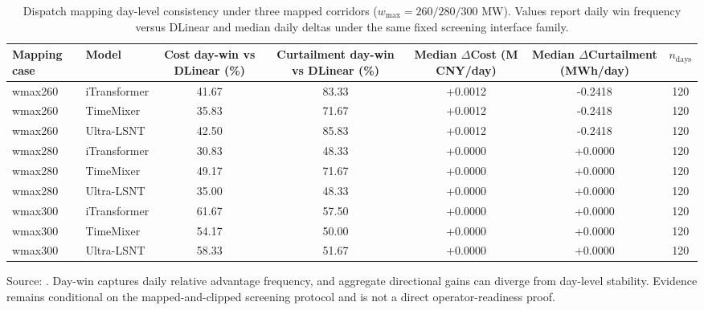﻿\documentclass[review,1p,times]{elsarticle}
\begin{document}
\begin{table}[t]
\centering
\caption{Dispatch mapping day-level consistency under three mapped corridors ($w_{\max}=260/280/300$ MW). Values report daily win frequency versus DLinear and median daily deltas under the same fixed screening interface family.}
\label{tab:dispatch_mapping_daylevel_consistency}
\begingroup
\setlength{\tabcolsep}{4pt}
\small
\begin{tabular}{llccccc}
\toprule
Mapping case & Model & Cost day-win vs DLinear (\%) & Curtailment day-win vs DLinear (\%) & Median $\Delta$Cost (M CNY/day) & Median $\Delta$Curtailment (MWh/day) & $n_{\text{days}}$ \\
\midrule
wmax260 & iTransformer & 41.67 & 83.33 & +0.0012 & -0.2418 & 120 \\
wmax260 & TimeMixer & 35.83 & 71.67 & +0.0012 & -0.2418 & 120 \\
wmax260 & Ultra-LSNT & 42.50 & 85.83 & +0.0012 & -0.2418 & 120 \\
\midrule
wmax280 & iTransformer & 30.83 & 48.33 & +0.0000 & +0.0000 & 120 \\
wmax280 & TimeMixer & 49.17 & 71.67 & +0.0000 & +0.0000 & 120 \\
wmax280 & Ultra-LSNT & 35.00 & 48.33 & +0.0000 & +0.0000 & 120 \\
\midrule
wmax300 & iTransformer & 61.67 & 57.50 & +0.0000 & +0.0000 & 120 \\
wmax300 & TimeMixer & 54.17 & 50.00 & +0.0000 & +0.0000 & 120 \\
wmax300 & Ultra-LSNT & 58.33 & 51.67 & +0.0000 & +0.0000 & 120 \\
\bottomrule
\end{tabular}
\vspace{3pt}
\footnotesize Source: . Day-win captures daily relative advantage frequency, and aggregate directional gains can diverge from day-level stability. Evidence remains conditional on the mapped-and-clipped screening protocol and is not a direct operator-readiness proof.
\endgroup
\end{table}
\end{document}
